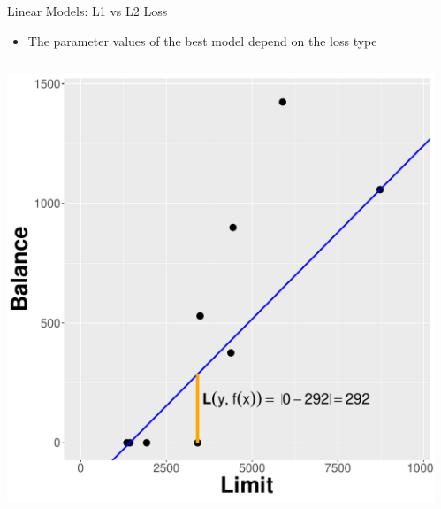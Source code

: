 \documentclass[11pt,compress,t,notes=noshow, xcolor=table]{beamer}
\begin{document}
\begin{vbframe}{Linear Models: L1 vs L2 Loss}

\begin{itemize}
\item \small The parameter values of the best model depend on the loss type
\end{itemize}
\begin{columns}  
\begin{column}{0.5\textwidth} 
\begin{center}
  \includegraphics[width = \textwidth]{slides/supervised-regression/figure/nutshell-regression-L1-regr-line.pdf}
\end{center}
\end{column}
\begin{column}{0.5\textwidth} 
\begin{center}

\end{center}
\end{column}
\end{columns}
\end{vbframe}
\end{document}
